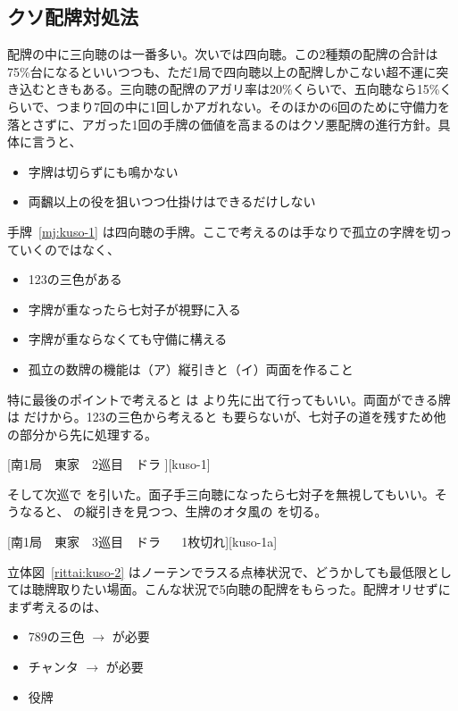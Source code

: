 \documentclass[../nankiru_main.tex]{subfiles}
\begin{document}
\subsection{クソ配牌対処法}

配牌の中に三向聴のは一番多い。次いでは四向聴。この2種類の配牌の合計は75\%台になるといいつつも、ただ1局で四向聴以上の配牌しかこない超不運に突き込むときもある。三向聴の配牌のアガリ率は20\%くらいで、五向聴なら15\%くらいで、つまり7回の中に1回しかアガれない。そのほかの6回のために守備力を落とさずに、アガった1回の手牌の価値を高まるのはクソ悪配牌の進行方針。具体に言うと、

\begin{itemize}
\item 字牌は切らずにも鳴かない
\item 両飜以上の役を狙いつつ仕掛けはできるだけしない
\end{itemize}

手牌~\ref{mj:kuso-1} は四向聴の手牌。ここで考えるのは手なりで孤立の字牌を切っていくのではなく、

\begin{itemize}
\item 123の三色がある
\item 字牌が重なったら七対子が視野に入る
\item 字牌が重ならなくても守備に構える
\item 孤立の数牌の機能は（ア）縦引きと（イ）両面を作ること
\end{itemize}

特に最後のポイントで考えると  は  より先に出て行ってもいい。両面ができる牌は  だけから。123の三色から考えると  も要らないが、七対子の道を残すため他の部分から先に処理する\citep{ooi-badhaipai}。

[南1局　東家　2巡目　ドラ ][kuso-1]

そして次巡で  を引いた。面子手三向聴になったら七対子を無視してもいい。そうなると、 の縦引きを見つつ、生牌のオタ風の  を切る\citep{ooi-badhaipai}。

[南1局　東家　3巡目　ドラ 　 1枚切れ][kuso-1a]

立体図~\ref{rittai:kuso-2} はノーテンでラスる点棒状況で、どうかしても最低限としては聴牌取りたい場面\citep{haneru-badhaipai}。こんな状況で5向聴の配牌をもらった。配牌オリせずにまず考えるのは、

\begin{itemize}
\item 789の三色 $\to$  が必要
\item チャンタ $\to$  が必要
\item 役牌 
\end{itemize}
\end{document}
